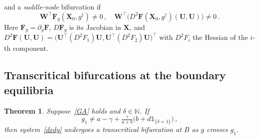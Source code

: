 \documentclass[reqno,11pt]{amsart}
\newtheorem{thm}{Theorem}[section]
\numberwithin{equation}{section}
\newcommand{\N}{\mathbb{N}}
\begin{document}
and a {\it saddle-node} bifurcation if
\begin{equation}\label{sotoSN}
\mathbf W^\top\mathbf F_g(\mathbf X_0,g^\dagger)\neq0\,,\quad \mathbf W^\top\big(D^2\mathbf F(\mathbf X_0,g^\dagger)(\mathbf U,\mathbf U)\big)\neq0\,.
\end{equation}
Here $\mathbf F_g=\partial_g\mathbf F$, $D\mathbf F_g$ is its Jacobian in $\mathbf X$, and $D^2\mathbf F(\mathbf U,\mathbf U)=\big(\mathbf U^\top(D^2F_1)\mathbf U, \mathbf U^\top(D^2F_2)\mathbf U\big)^\top$ with $D^2F_i$ the Hessian of the $i$-th component.

\subsection{Transcritical bifurcations at the boundary equilibria}\label{subsec:bif-boundary}

\begin{thm}\label{thm:transcritB}
Suppose~\eqref{GA} holds and $\delta\in\N$. If
\begin{equation}\label{ndB}
g_1\neq a-\gamma+\tfrac{\gamma}{a+b}\big(b+d\mathds 1_{\{\delta=1\}}\big)\,,
\end{equation}
then system~\eqref{dxdy} undergoes a transcritical bifurcation at $B$ as $g$ crosses $g_1$.
\end{thm}
\end{document}
